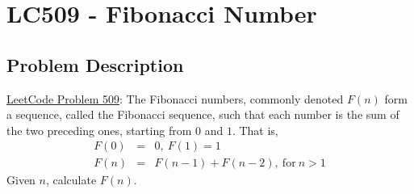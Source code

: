 \documentclass[justified]{tufte-book}
\begin{document}
\section{LC509 - Fibonacci Number} \label{sec:lc509_fibonacci}
\subsection{Problem Description}
\href{https://leetcode.com/problems/fibonacci-number/}{LeetCode Problem 509}: The Fibonacci numbers, commonly denoted $F(n)$ form a sequence, called the Fibonacci sequence, such that each number is the sum of the two preceding ones, starting from $0$ and $1$. That is,
\begin{eqnarray*}
    F(0) &=& 0,~ F(1) = 1 \\
    F(n) &=& F(n-1) + F(n-2), ~ \text{for}~ n > 1
\end{eqnarray*}
Given $n$, calculate $F(n)$.


\end{document}
